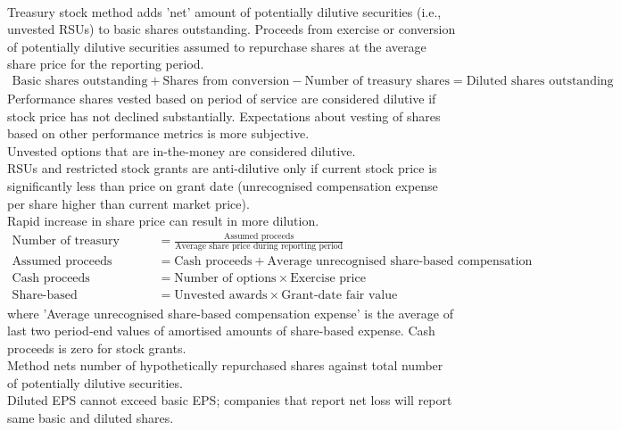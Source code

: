 \begin{method}  \\
Treasury stock method adds 'net' amount of potentially dilutive securities (i.e., unvested RSUs) to basic shares outstanding. Proceeds from exercise or conversion of potentially dilutive securities assumed to repurchase shares at the average share price for the reporting period.
\begin{align}
\text{Basic shares outstanding} + \text{Shares from conversion} - \text{Number of treasury shares} = \text{Diluted shares outstanding} \nonumber
\end{align}
Performance shares vested based on period of service are considered dilutive if stock price has not declined substantially. Expectations about vesting of shares based on other performance metrics is more subjective.\\
Unvested options that are in-the-money are considered dilutive.\\
RSUs and restricted stock grants are anti-dilutive only if current stock price is significantly less than price on grant date (unrecognised compensation expense per share higher than current market price).\\
Rapid increase in share price can result in more dilution.
\begin{align}
\text{Number of treasury shares} &= \frac{\text{Assumed proceeds}}{\text{Average share price during reporting period}} \nonumber \\
\text{Assumed proceeds} &= \text{Cash proceeds} + \text{Average unrecognised share-based compensation expense} \nonumber \\
\text{Cash proceeds} &= \text{Number of options} \times \text{Exercise price} \nonumber\\
\text{Share-based compensation expense} &= \text{Unvested awards} \times \text{Grant-date fair value} \nonumber
\end{align}
where 'Average unrecognised share-based compensation expense' is the average of last two period-end values of amortised amounts of share-based expense. Cash proceeds is zero for stock grants.\\
Method nets number of hypothetically repurchased shares against total number of potentially dilutive securities.\\
Diluted EPS cannot exceed basic EPS; companies that report net loss will report same basic and diluted shares.
\end{method}

